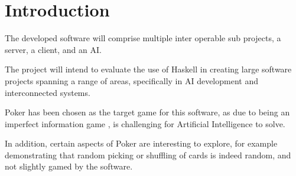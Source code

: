 \section{Introduction}
The developed software will comprise multiple inter operable sub projects, a server, a client, and an AI\@.

The project will intend to evaluate the use of Haskell \parencite{hudak1992} in creating large software projects spanning a range of areas, specifically in AI development and interconnected systems.

Poker has been chosen as the target game for this software, as due to being an imperfect information game \parencite{sandholm2010}, is challenging for Artificial Intelligence to solve.

In addition, certain aspects of Poker are interesting to explore, for example demonstrating that random picking or shuffling of cards is indeed random, and not slightly gamed by the software. 

